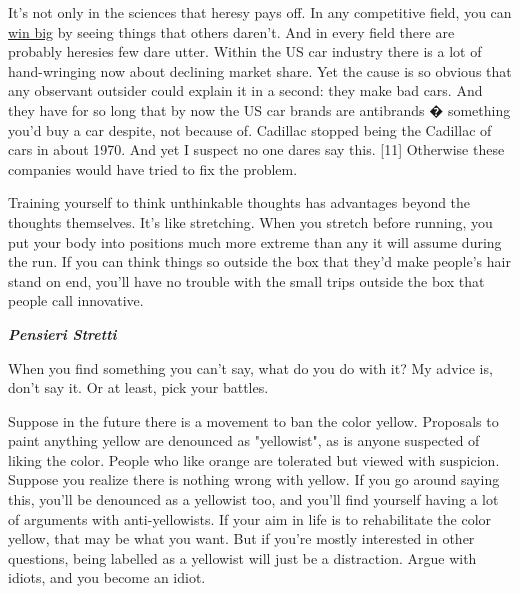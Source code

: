 It's not only in the sciences that heresy
                  pays off. In any competitive field, you can
                  \href{http://www.paulgraham.com/avg.html}{win big} by seeing things that others
                  daren't. And in every field there are probably heresies few
                  dare utter. Within the US car industry there is a lot of
                  hand-wringing now about declining market share. Yet the cause
                  is so obvious that any observant outsider could explain it in
                  a second: they make bad cars. And they have for so long that
                  by now the US car brands are antibrands � something you'd buy
                  a car despite, not because of. Cadillac stopped being the
                  Cadillac of cars in about 1970. And yet I suspect no one dares
                  say this. [11] Otherwise these companies would have tried to
                  fix the problem.

Training yourself to think
                  unthinkable thoughts has advantages beyond the thoughts
                  themselves. It's like stretching. When you stretch before
                  running, you put your body into positions much more extreme
                  than any it will assume during the run. If you can think
                  things so outside the box that they'd make people's hair stand
                  on end, you'll have no trouble with the small trips outside
                  the box that people call innovative.

\textbf{\emph{Pensieri Stretti}}

When you find something you can't say, what do
                  you do with it? My advice is, don't say it. Or at least, pick
                  your battles.

Suppose in the future there is a
                  movement to ban the color yellow. Proposals to paint anything
                  yellow are denounced as "yellowist", as is anyone suspected of
                  liking the color. People who like orange are tolerated but
                  viewed with suspicion. Suppose you realize there is nothing
                  wrong with yellow. If you go around saying this, you'll be
                  denounced as a yellowist too, and you'll find yourself having
                  a lot of arguments with anti-yellowists. If your aim in life
                  is to rehabilitate the color yellow, that may be what you
                  want. But if you're mostly interested in other questions,
                  being labelled as a yellowist will just be a distraction.
                  Argue with idiots, and you become an idiot.

